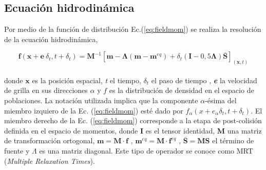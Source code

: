 \subsection{Ecuación hidrodinámica}

Por medio de la función de distribución Ec.(\ref{eq:fieldmom}) \cite{li2013lattice} se realiza la resolución de la ecuación hidrodinámica,


\begin{equation}
    \mathbf{f}(\mathbf{x} + \mathbf{e} \> \delta_{t} , t + \delta_{t}) = \mathbf{M}^{-1} \left[ \mathbf{m} - \mathbf{\Lambda}(\mathbf{m} - \mathbf{m}^{eq}) + \delta_{t} \left( \mathbf{I} - 0,5 \mathbf{\Lambda} \right) \mathbf{\bar{S}}  \right]_{(\mathbf{x},t)} 
    \label{eq:fieldmom}
\end{equation}\\
donde $\mathbf{x}$ es la posición espacial, \textit{t} el tiempo, $\delta_{t}$ el paso de tiempo , \textit{\textbf{e}} la velocidad de grilla en sus direcciones $\alpha$ y $\textit{f}$ es la distribución de densidad en el espacio de poblaciones. La notación utilizada implica que la componente $\alpha$-ésima del miembro izquiero de la Ec. (\ref{eq:fieldmom}) esté dado por $f_{\alpha}(x + e_{\alpha} \delta_{t}  , t + \delta_{t} )$. El miembro derecho de la Ec. (\ref{eq:fieldmom}) corresponde a la etapa de post-colisión definida en el espacio de momentos, donde \textbf{I} es el tensor identidad, \textbf{M} una matriz de transformación ortogonal, $\mathbf{m} = \mathbf{M} \cdot \mathbf{f}$ , $\mathbf{m}^{eq} = \mathbf{M} \cdot \mathbf{f}^{eq}$ , $\mathbf{\bar{S}} = \mathbf{M} \mathbf{S}$ el término de fuente y $ \Lambda$ es una matriz diagonal. Este tipo de operador se conoce como MRT (\textit{Multiple Relaxation Times}).

